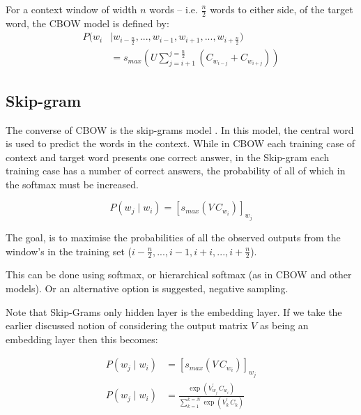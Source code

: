 \documentclass[parskip]{komatufte}
\begin{document}
For a context window of width $n$ words -- i.e. $\frac{n}{2}$ words to either side, of the target word,
the CBOW model is defined by:
\begin{align}
P(w_i & \mid w_{i-\frac{n}{2}},..., w_{i-1}, w_{i+1},...,w_{i+\frac{n}{2}})  \nonumber
\\  & = s_{max}(U \sum_{j=i+1}^{j=\frac{n}{2}} \left( C_{w_{i-j}}+C_{w_{i+j}} \right))
\end{align}




\subsection{Skip-gram}\label{sec:skip-gram}


The converse of CBOW is the skip-grams model .
In this model, the central word is used to predict the words in the context.
While in CBOW each training case of context and target word presents one correct answer,
in the Skip-gram each training case has a number of correct answers, the probability of all of which in the softmax must be increased.

\begin{equation}
P(w_j \mid w_{i}) = \left[ s_{max}(V\,C_{w_{i}}) \right]_{w_j} 
\end{equation}


The goal, is to maximise the probabilities of all the observed outputs from the window's in the training set ($i-\frac{n}{2},...,i-1, i+i,...,i+\frac{n}{2}$).


This can be done using softmax, or hierarchical softmax (as in CBOW and other models).
Or an alternative option is suggested, negative sampling.

Note that Skip-Grams only hidden layer is the embedding layer.
If we take the earlier discussed notion of considering the output matrix $V$ as being an embedding layer
then this becomes:

\begin{align}
P(w_j \mid w_{i}) & = \left[ s_{max}(V\,C_{w_{i}}) \right]_{w_j} \\
P(w_j \mid w_{i}) & = \frac{\exp(V_{w_j}^\prime\,C_{w_{i}})}{\sum_{k=1}^{k=N} \exp(V_k^\prime\,C_{k})}
\end{align}
\end{document}
